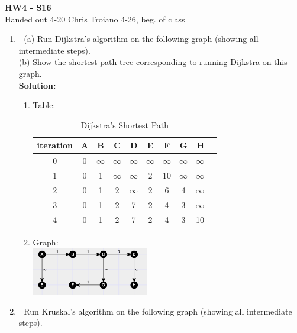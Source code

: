 \documentclass[11pt]{article}
\begin{document}
\begin{center}
{\bf\large HW4 - S16}\\
Handed out 4-20 \hfill Chris Troiano \hfill 4-26, beg. of class \\
\end{center}

\begin{enumerate}
\item$\;$
(a) Run Dijkstra's algorithm on the following graph (showing all
intermediate steps).\\
(b) Show the shortest path tree corresponding to running Dijkstra on
this graph.\\

{\bf Solution:}\\
\begin{enumerate}
\item Table:
\begin{table}[h]
\renewcommand{\arraystretch}{1.3}
\caption{Dijkstra's Shortest Path}
\label{tab:Dijkstra's}
\centering
\begin{tabular}{c|c|c|c|c|c|c|c|r|l}
iteration & A & B & C & D & E & F & G & H
\\ \hline \hline
0 & 0 & $\infty$ & $\infty$ & $\infty$ & $\infty$ & $\infty$ & $\infty$ & $\infty$ \\
1 & 0 & 1 & $\infty$ & $\infty$ & 2 & 10 & $\infty$ & $\infty$ \\
2 & 0 & 1 & 2 & $\infty$ & 2 & 6 & 4 & $\infty$ \\
3 & 0 & 1 & 2 & 7 & 2 & 4 & 3 & $\infty$ \\
4 & 0 & 1 & 2 & 7 & 2 & 4 & 3 & 10 \\

\end{tabular}
\end{table}

\item Graph:\\
\includegraphics[width=2in]{2ndgraph.png}
\end{enumerate}

\item$\;$
 Run Kruskal's algorithm on the following graph (showing all
intermediate steps).\\


\end{enumerate}
\end{document}
